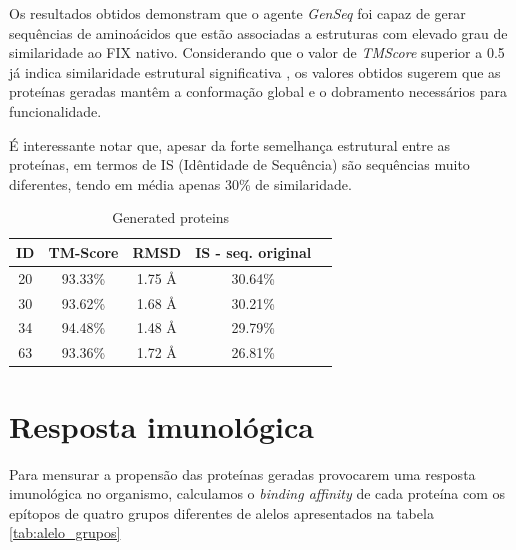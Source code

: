 Os resultados obtidos demonstram que o agente \textit{GenSeq} foi capaz de gerar sequências de aminoácidos que
estão associadas a estruturas com elevado grau de similaridade ao FIX nativo.
Considerando que o valor de \textit{TMScore} superior a 0.5 já indica similaridade estrutural significativa \cite{05TMScore},
os valores obtidos sugerem que as proteínas geradas mantêm a conformação global e o dobramento necessários para funcionalidade.

É interessante notar que, apesar da forte semelhança estrutural entre as proteínas,
em termos de IS (Idêntidade de Sequência)
são sequências muito diferentes, tendo em média apenas 30\% de similaridade. 
  
\begin{table}[htbp]
    \centering
    \begin{tabular}{c|cccc}
        \hline
        \textbf{ID} & \textbf{TM-Score} & \textbf{RMSD} & \textbf{IS - seq. original} \\
        \hline
         20 & 93.33\% & 1.75 Å & 30.64\% \\
         30 & 93.62\% & 1.68 Å & 30.21\% \\
         34 & 94.48\% & 1.48 Å & 29.79\% \\
         63 & 93.36\% & 1.72 Å & 26.81\% \\
        \hline
    \end{tabular}
    \caption{Generated proteins}
    \label{tab:tabela_exemplo}
\end{table}



\section{Resposta imunológica}
\label{section:imuno_resultados}
Para mensurar a propensão das proteínas geradas provocarem uma resposta imunológica no organismo, 
calculamos o \textit{binding affinity} de cada proteína com os epítopos de quatro grupos diferentes 
de alelos apresentados na tabela \ref{tab:alelo_grupos}


